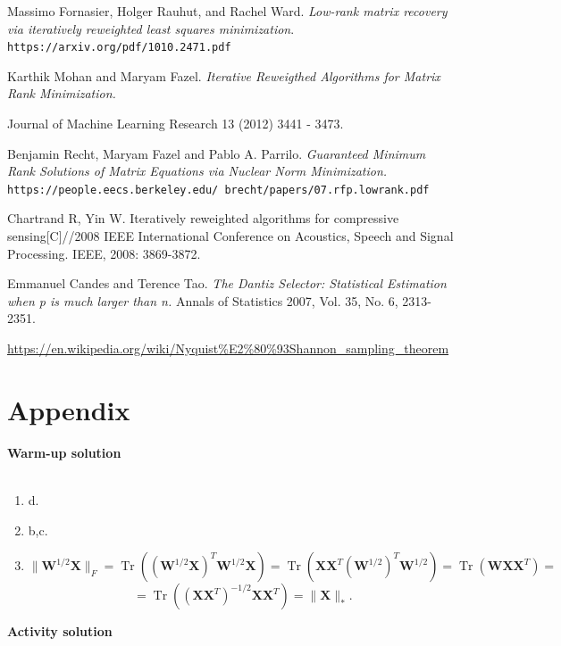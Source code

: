 \documentclass[12pt]{article}
\def \bX{\boldsymbol{X}}
\def \bW{\boldsymbol{W}}
\DeclareMathOperator{\Tr}{Tr}
\begin{document}
\begin{thebibliography}{9}
Massimo Fornasier, Holger Rauhut, and Rachel Ward. 
\textit{Low-rank matrix recovery via iteratively reweighted least squares minimization}. 
\\\texttt{https://arxiv.org/pdf/1010.2471.pdf}
 
Karthik Mohan and Maryam Fazel.
\textit{Iterative Reweigthed Algorithms for Matrix Rank Minimization.} 
 
Journal of Machine Learning Research 13 (2012) 3441 - 3473.
 
Benjamin Recht, Maryam Fazel and Pablo A. Parrilo.
\textit{Guaranteed Minimum Rank Solutions of Matrix Equations via Nuclear Norm Minimization.} 
\\\texttt{https://people.eecs.berkeley.edu/~brecht/papers/07.rfp.lowrank.pdf}

Chartrand R, Yin W. Iteratively reweighted algorithms for compressive sensing[C]//2008 IEEE International Conference on Acoustics, Speech and Signal Processing. IEEE, 2008: 3869-3872.


Emmanuel Candes and Terence Tao.
\textit{The Dantiz Selector: Statistical Estimation when p is much larger than n.} 
Annals of Statistics 2007, Vol. 35, No. 6, 2313-2351.

\url{https://en.wikipedia.org/wiki/Nyquist%E2%80%93Shannon_sampling_theorem}
\end{thebibliography}  
\newpage
\section{Appendix}
\textbf{{\large Warm-up solution}}
\mbox{ }\\
\mbox{ }\\
\begin{enumerate}
\item d.
\item b,c.
\item
\[\|\bW^{1/2}\bX\|_F = \Tr((\bW^{1/2}\bX)^T\bW^{1/2}\bX) = \Tr(\bX\bX^T(\bW^{1/2})^T\bW^{1/2}) =\Tr(\bW\bX\bX^T) = \]
\[= \Tr\left((\bX\bX^T)^{-1/2}\bX\bX^T \right) = \|\bX\|_*.\]
\end{enumerate}

\textbf{{\large Activity solution}}
\mbox{ }\\
\mbox{ }\\
\end{document}
